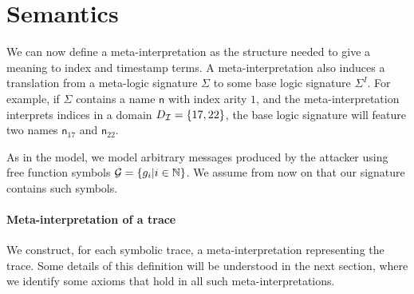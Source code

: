 \section{Semantics}

We can now define a meta-interpretation as the structure needed to
give a meaning to index and timestamp terms. A meta-interpretation
also induces a translation from a meta-logic signature $\Sigma$
to some base logic signature $\Sigma^I$. For example, if
$\Sigma$ contains a name $\mathsf{n}$ with index arity $1$, and
the meta-interpretation interprets indices in a domain $D_{\mathcal{I}} = \{
  17, 22 \}$, the base logic signature will feature
two names $\mathsf{n}_{17}$ and $\mathsf{n}_{22}$.

As in the \BC model, we model arbitrary messages produced by the attacker
using free function symbols $\mathcal{G} = \{g_i | i \in \mathbb{N}\}$. We assume
from now on that our signature contains such symbols.

\paragraph{Meta-interpretation of a trace}

We construct, for each symbolic trace, a meta-interpretation representing
the trace. Some details of this definition will be understood in the next
section, where we identify some axioms that hold in all such
meta-interpretations.

